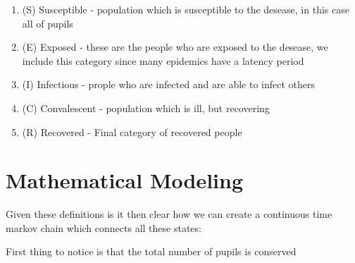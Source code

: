 \begin{enumerate}
    \item (S) Susceptible - population which is susceptible to the desease, in this case all of pupils
    \item (E) Exposed - these are the people who are exposed to the desease, we include this category since many epidemics have a latency period
    \item (I) Infectious - prople who are infected and are able to infect others
    \item (C) Convalescent - population which is ill, but recovering
    \item (R) Recovered - Final category of recovered people
\end{enumerate}


\section*{Mathematical Modeling}

Given these definitions is it then clear how we can create a continuous time markov chain which connects all these states:



First thing to notice is that the total number of pupils is conserved 

